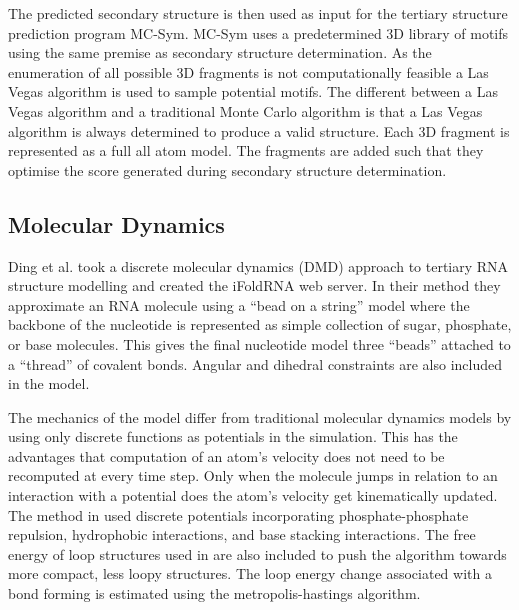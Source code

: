 \documentclass[journal]{IEEEtran}
\begin{document}
The predicted secondary structure is then used as input for the tertiary structure prediction program MC-Sym. MC-Sym uses a predetermined 3D library of motifs using the same premise as secondary structure determination. As the enumeration of all possible 3D fragments is not computationally feasible a Las Vegas algorithm is used to sample potential motifs. The different between a Las Vegas algorithm and a traditional Monte Carlo algorithm is that a Las Vegas algorithm is always determined to produce a valid structure. Each 3D fragment is represented as a full all atom model. The fragments are added such that they optimise the score generated during secondary structure determination.

\subsection{Molecular Dynamics}
Ding et al. \cite{ding2008ab} took a discrete molecular dynamics (DMD) approach to tertiary RNA structure modelling and created the iFoldRNA web server. In their method they approximate an RNA molecule using a ``bead on a string'' model where the backbone of the nucleotide is represented as simple collection of sugar, phosphate, or base molecules. This gives the final nucleotide model three ``beads'' attached to a ``thread'' of covalent bonds. Angular and dihedral constraints are also included in the model.

The mechanics of the model differ from traditional molecular dynamics models by using only discrete functions as potentials in the simulation. This has the advantages that computation of an atom's velocity does not need to be recomputed at every time step. Only when the molecule jumps in relation to an interaction with a potential does the atom's velocity get kinematically updated. The method in \cite{ding2008ab} used discrete potentials incorporating phosphate-phosphate repulsion, hydrophobic interactions, and base stacking interactions. The free energy of loop structures used in \cite{mathews1999expanded} are also included to push the algorithm towards more compact, less loopy structures. The loop energy change associated with a bond forming is estimated using the metropolis-hastings algorithm.


\end{document}
